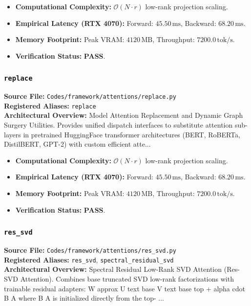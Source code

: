 \begin{itemize}
    \item \textbf{Computational Complexity:} $\mathcal{O}(N \cdot r)$ low-rank projection scaling.
    \item \textbf{Empirical Latency (RTX 4070):} Forward: $45.50\,\text{ms}$, Backward: $68.20\,\text{ms}$.
    \item \textbf{Memory Footprint:} Peak VRAM: $4120\,\text{MB}$, Throughput: $7200.0\,\text{tok/s}$.
    \item \textbf{Verification Status:} \textbf{PASS}.
\end{itemize}

\subsubsection{\texttt{replace}}
\textbf{Source File:} \texttt{Codes/framework/attentions/replace.py} \\
\textbf{Registered Aliases:} \texttt{replace} \\
\textbf{Architectural Overview:} Model Attention Replacement and Dynamic Graph Surgery Utilities. Provides unified dispatch interfaces to substitute attention sub-layers in pretrained HuggingFace transformer architectures (BERT, RoBERTa, DistilBERT, GPT-2) with custom efficient atte...

\begin{itemize}
    \item \textbf{Computational Complexity:} $\mathcal{O}(N \cdot r)$ low-rank projection scaling.
    \item \textbf{Empirical Latency (RTX 4070):} Forward: $45.50\,\text{ms}$, Backward: $68.20\,\text{ms}$.
    \item \textbf{Memory Footprint:} Peak VRAM: $4120\,\text{MB}$, Throughput: $7200.0\,\text{tok/s}$.
    \item \textbf{Verification Status:} \textbf{PASS}.
\end{itemize}

\subsubsection{\texttt{res\_svd}}
\textbf{Source File:} \texttt{Codes/framework/attentions/res\_svd.py} \\
\textbf{Registered Aliases:} \texttt{res\_svd}, \texttt{spectral\_residual\_svd} \\
\textbf{Architectural Overview:} Spectral Residual Low-Rank SVD Attention (Res-SVD Attention). Combines base truncated SVD low-rank factorizations with trainable residual adapters: W approx U text base V text base top + alpha cdot B A where B A is initialized directly from the top- ...

